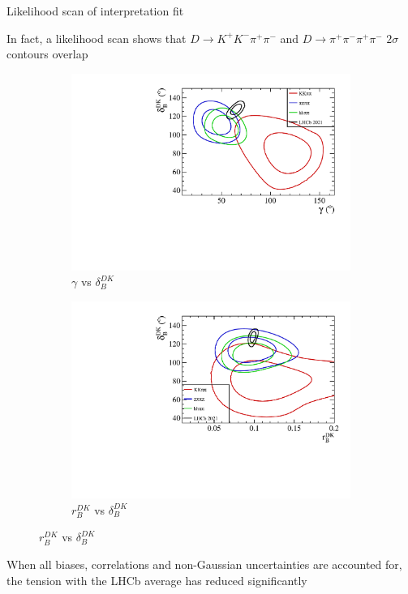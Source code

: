 \documentclass[xcolor={dvipsnames}]{beamer}
\begin{document}
\begin{frame}{Likelihood scan of interpretation fit}
  \begin{center}
    In fact, a likelihood scan shows that $D\to K^+K^-\pi^+\pi^-$ and $D\to\pi^+\pi^-\pi^+\pi^-$ $2\sigma$ contours overlap
  \end{center}
  \begin{figure}
    \centering
    \begin{subfigure}{0.50\textwidth}
      \centering
      \includegraphics[width=1.0\textwidth]{Plots/gamma_deltaB_hhpipi_LHCb_Prob_scan.pdf}
      \caption*{$\gamma$ vs $\delta_B^{DK}$}
    \end{subfigure}%
    \begin{subfigure}{0.50\textwidth}
      \centering
      \includegraphics[width=1.0\textwidth]{Plots/rB_deltaB_hhpipi_LHCb_Prob_scan.pdf}
      \caption*{$r_B^{DK}$ vs $\delta_B^{DK}$}
    \end{subfigure}
  \end{figure}
  \vspace{-0.3cm}
  \begin{center}
    When all biases, correlations and non-Gaussian uncertainties are accounted for, the tension with the LHCb average has reduced significantly
  \end{center}
\end{frame}
\end{document}
